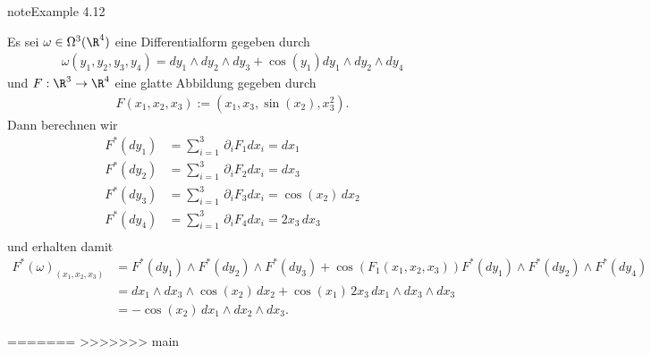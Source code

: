 \documentclass[letterpaper,10pt,english]{jupyterBook}
\begin{document}
\begin{sphinxadmonition}{note}{Example 4.12}



\sphinxAtStartPar
Es sei \(\omega\in \Omega^3(\R^4)\) eine Differentialform gegeben durch
\begin{equation*}
\begin{split}\omega(y_1,y_2,y_3,y_4) = dy_1\wedge dy_2\wedge dy_3 + \cos(y_1)dy_1\wedge dy_2 \wedge dy_4\end{split}
\end{equation*}
\sphinxAtStartPar
und \(F:\R^3\to\R^4\) eine glatte Abbildung gegeben durch
\begin{equation*}
\begin{split}F(x_1,x_2,x_3) := (x_1, x_3, \sin(x_2), x_3^2).\end{split}
\end{equation*}
\sphinxAtStartPar
Dann berechnen wir
\begin{equation*}
\begin{split}F^\ast(dy_1) &= \sum_{i=1}^3 \,\partial_i F_1 dx_i = dx_1\\
F^\ast(dy_2) &= \sum_{i=1}^3 \,\partial_i F_2 dx_i = dx_3\\
F^\ast(dy_3) &= \sum_{i=1}^3 \,\partial_i F_3 dx_i = \cos(x_2)\,dx_2\\
F^\ast(dy_4) &= \sum_{i=1}^3 \,\partial_i F_4 dx_i = 2x_3\,dx_3\\\end{split}
\end{equation*}
\sphinxAtStartPar
und erhalten damit
\begin{equation*}
\begin{split}F^\ast(\omega)_{(x_1,x_2,x_3)} &= F^\ast(dy_1)\wedge F^\ast(dy_2)\wedge F^\ast(dy_3) + 
\cos(F_1(x_1,x_2,x_3)) F^\ast(dy_1)\wedge F^\ast(dy_2)\wedge F^\ast(dy_4)\\
&= dx_1 \wedge dx_3\wedge \cos(x_2)\,dx_2 + \cos(x_1)\, 2x_3\,dx_1\wedge dx_3\wedge dx_3\\
&=  -\cos(x_2)\,dx_1 \wedge dx_2\wedge dx_3.\end{split}
\end{equation*}\end{sphinxadmonition}

=======
>>>>>>> main
\end{document}
